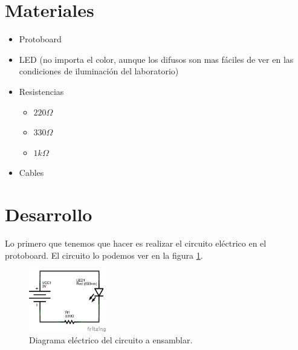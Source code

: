 \documentclass[paper=letter, fontsize=11pt]{scrartcl} %
\numberwithin{equation}{section} %
\numberwithin{figure}{section} %
\numberwithin{table}{section} %
\begin{document}

\section{Materiales}

	\begin{itemize}
		\item Protoboard
		\item LED (no importa el color, aunque los difusos son mas fáciles de ver en las condiciones de iluminación del laboratorio)
		\item Resistencias
		\begin{itemize}
			\item $220 \Omega$
			\item $330 \Omega$
			\item $1 k\Omega$
		\end{itemize}
		\item Cables
	\end{itemize}


\section{Desarrollo}

    Lo primero que tenemos que hacer es realizar el circuito eléctrico en el protoboard. El circuito lo podemos ver en la figura \ref{dia:elecir}. \\

    \begin{figure}[h]
    	\begin{center}
    		\includegraphics[width=0.3\textwidth]{LED-bateria-diagrama.png} %
    		\caption{Diagrama eléctrico del circuito a ensamblar.}
    		\label{dia:elecir}
    	\end{center}
    \end{figure}
\end{document}
